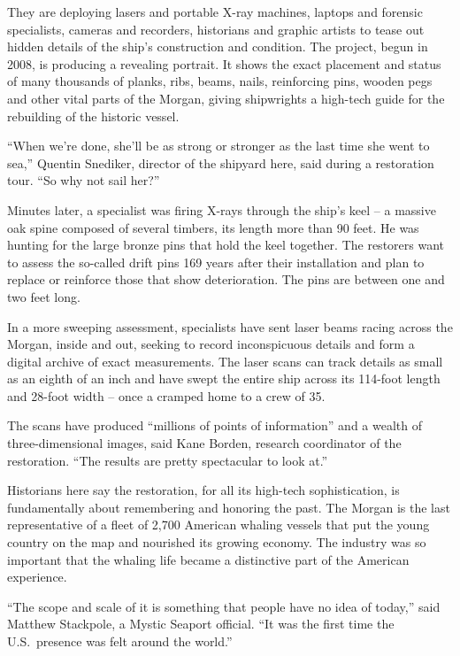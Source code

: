 ﻿\documentclass[12pt]{article}
\begin{document}
They are deploying lasers and portable X-ray machines, laptops and forensic specialists, cameras and
recorders, historians and graphic artists to tease out hidden details of the ship's construction and
condition. The project, begun in 2008, is producing a revealing portrait. It shows the exact
placement and status of many thousands of planks, ribs, beams, nails, reinforcing pins, wooden pegs
and other vital parts of the Morgan, giving shipwrights a high-tech guide for the rebuilding of the
historic vessel.

``When we're done, she'll be as strong or stronger as the last time she went to sea,'' Quentin
Snediker, director of the shipyard here, said during a restoration tour. ``So why not sail her?''

Minutes later, a specialist was firing X-rays through the ship's keel -- a massive oak spine
composed of several timbers, its length more than 90 feet. He was hunting for the large bronze pins
that hold the keel together. The restorers want to assess the so-called drift pins 169 years after
their installation and plan to replace or reinforce those that show deterioration. The pins are
between one and two feet long.

In a more sweeping assessment, specialists have sent laser beams racing across the Morgan, inside
and out, seeking to record inconspicuous details and form a digital archive of exact measurements.
The laser scans can track details as small as an eighth of an inch and have swept the entire ship
across its 114-foot length and 28-foot width -- once a cramped home to a crew of 35.

The scans have produced ``millions of points of information'' and a wealth of three-dimensional
images, said Kane Borden, research coordinator of the restoration. ``The results are pretty
spectacular to look at.''

Historians here say the restoration, for all its high-tech sophistication, is fundamentally about
remembering and honoring the past. The Morgan is the last representative of a fleet of 2,700
American whaling vessels that put the young country on the map and nourished its growing economy.
The industry was so important that the whaling life became a distinctive part of the American
experience.

``The scope and scale of it is something that people have no idea of today,'' said Matthew
Stackpole, a Mystic Seaport official. ``It was the first time the U.S.~presence was felt around the
world.''
\end{document}
